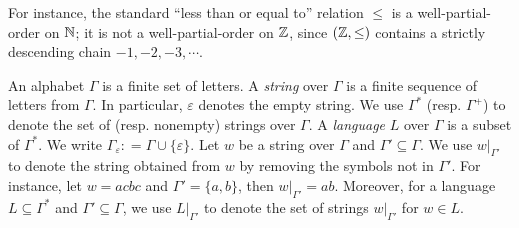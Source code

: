 %
%
For instance, the standard ``less than or equal to'' relation $\leq$ is a well-partial-order on $\mathbb{N}$; it is not a well-partial-order on $\mathbb{Z}$, since $(\mathbb{Z}, \leq)$ contains a strictly descending chain $-1, -2, -3, \cdots$. 



%


An alphabet $\Gamma$ is a finite set of letters.  A \emph{string} over $\Gamma$ is a finite sequence of letters from $\Gamma$. In particular, $\varepsilon$ denotes %
the empty string. We use $\Gamma^*$ (resp. $\Gamma^+$) to denote the set of (resp. nonempty) strings over $\Gamma$. A \emph{language} $L$ over $\Gamma$ is a  subset of $\Gamma^*$. We write $\Gamma_\varepsilon: = \Gamma \cup \{\varepsilon\}$. Let $w$ be a string over $\Gamma$ and $\Gamma' \subseteq \Gamma$. We use $w |_{\Gamma'}$ to denote the string obtained from $w$ by removing the symbols not in $\Gamma'$. For instance, let $w = a  c b c$ and $\Gamma' = \{a,b\}$, then $w|_{\Gamma'} = ab$. Moreover, for a language $L \subseteq \Gamma^*$ and $\Gamma' \subseteq \Gamma$, we use $L|_{\Gamma'}$ to denote the set of strings $w |_{\Gamma'}$ for $w \in L$. 
 
